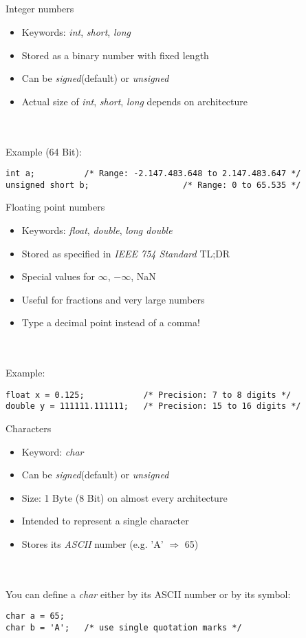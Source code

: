 \subsection{}
\begin{frame}[fragile]{Integer numbers}
	\begin{itemize}
		\item Keywords: \textit{int}, \textit{short}, \textit{long}
		\item Stored as a binary number with fixed length
		\item Can be \textit{signed}(default) or \textit{unsigned}
		\item Actual size of \textit{int}, \textit{short}, \textit{long} depends on architecture
	\end{itemize}\ \\
	\ \\
	Example (64 Bit):
	\begin{lstlisting}[numbers=none]
int a;			/* Range: -2.147.483.648 to 2.147.483.647 */
unsigned short b;					/* Range: 0 to 65.535 */
\end{lstlisting}
\end{frame}
\begin{frame}[fragile]{Floating point numbers}
	\begin{itemize}
		\item Keywords: \textit{float}, \textit{double}, \textit{long double}
		\item Stored as specified in \textit{IEEE 754 Standard} TL;DR
		\item Special values for $\infty$, $-\infty$, NaN
		\item Useful for fractions and very large numbers
		\item Type a decimal point instead of a comma!
	\end{itemize}\ \\
	\ \\
	Example:
	\begin{lstlisting}[numbers=none]
float x = 0.125;			/* Precision: 7 to 8 digits */
double y = 111111.111111;	/* Precision: 15 to 16 digits */
\end{lstlisting}
\end{frame}
\begin{frame}[fragile]{Characters}
	\begin{itemize}
		\item Keyword: \textit{char}
		\item Can be \textit{signed}(default) or \textit{unsigned}	
		\item Size: 1 Byte (8 Bit) on almost every architecture
		\item Intended to represent a single character
		\item Stores its \textit{ASCII} number (e.g. 'A' $\Rightarrow$ 65)
	\end{itemize}\ \\
	\ \\
	You can define a \textit{char} either by its ASCII number or by its symbol:
	\begin{lstlisting}[numbers=none]
char a = 65;
char b = 'A';	/* use single quotation marks */
\end{lstlisting}
\end{frame}
